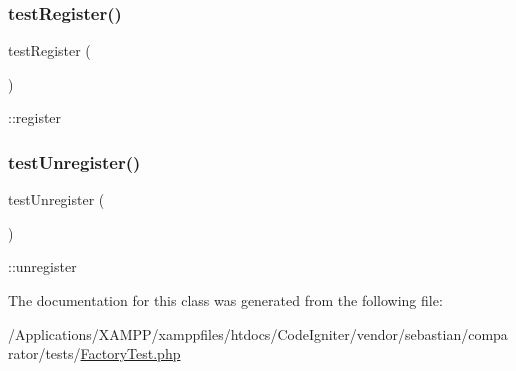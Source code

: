 \subsubsection{\texorpdfstring{test\+Register()}{testRegister()}}
{\footnotesize\ttfamily test\+Register (\begin{DoxyParamCaption}{ }\end{DoxyParamCaption})}

\+::register \mbox{\label{class_sebastian_bergmann_1_1_comparator_1_1_factory_test_a292071d9a8476ecfcdb82ff16400c5b7}} 
\subsubsection{\texorpdfstring{test\+Unregister()}{testUnregister()}}
{\footnotesize\ttfamily test\+Unregister (\begin{DoxyParamCaption}{ }\end{DoxyParamCaption})}

\+::unregister 

The documentation for this class was generated from the following file\+:\begin{DoxyCompactItemize}
\item 
/\+Applications/\+X\+A\+M\+P\+P/xamppfiles/htdocs/\+Code\+Igniter/vendor/sebastian/comparator/tests/\mbox{\hyperlink{_factory_test_8php}{Factory\+Test.\+php}}\end{DoxyCompactItemize}
